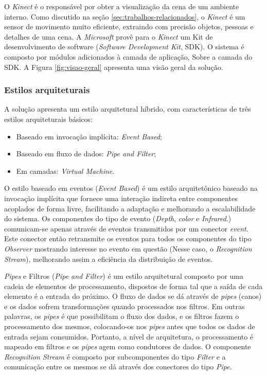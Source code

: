 O \textit{Kinect} é o responsável por obter a visualização da cena de um ambiente interno. Como discutido na seção \ref{sec:trabalhos-relacionados}, o \textit{Kinect} é um sensor de movimento muito eficiente, extraindo com precisão objetos, pessoas e detalhes de uma cena. A \textit{Microsoft} provê para o \textit{Kinect} um Kit de desenvolvimento de software (\textit{Software Development Kit}, SDK). O sistema é composto por módulos adicionados à camada de aplicação, Sobre a camada do SDK. A Figura \ref{fig:visao-geral} apresenta uma visão geral da solução.

\subsubsection{Estilos arquiteturais}\label{sec:estilosArq}
A solução apresenta um estilo arquitetural híbrido, com características de três estilos arquiteturais básicos:

\begin{itemize}
\item Baseado em invocação implícita: \textit{Event Based}; 
\item Baseado em fluxo de dados: \textit{Pipe and Filter}; 
\item Em camadas: \textit{Virtual Machine}.
\end{itemize}

O estilo baseado em eventos (\textit{Event Based}) é um estilo arquitetônico baseado na invocação implícita que fornece uma interação indireta entre componentes acoplados de forma livre, facilitando a adaptação e melhorando a escalabilidade do sistema. Os componentes do tipo de evento (\textit{Depth}, \textit{color} e \textit{Infrared}.) comunicam-se apenas através de eventos transmitidos por um conector \textit{event}.
Este conector então retransmite os eventos para todos os componentes do tipo \textit{Observer} mostrando interesse no evento em questão (Nesse caso, o \textit{Recognition Stream}), melhorando assim a eficiência da distribuição de eventos.

\textit{Pipes} e Filtros (\textit{Pipe and Filter}) é um estilo arquitetural composto por uma cadeia de elementos de processamento, dispostos de forma tal que a saída de cada elemento é a entrada do próximo. O fluxo de dados se dá através de \textit{pipes} (canos) e os dados sofrem transformações quando processados nos filtros. Em outras palavras, os \textit{pipes} é que possibilitam o fluxo dos dados, e os filtros fazem o processamento dos mesmos, colocando-os nos \textit{pipes} antes que todos os dados de entrada sejam consumidos. Portanto, a nível de arquitetura, o processamento é mapeado em filtros e os \textit{pipes} agem como condutores de dados. O componente \textit{Recognition Stream} é composto por subcomponentes do tipo \textit{Filter} e a comunicação entre os mesmos se dá através dos conectores do tipo \textit{Pipe}. 

